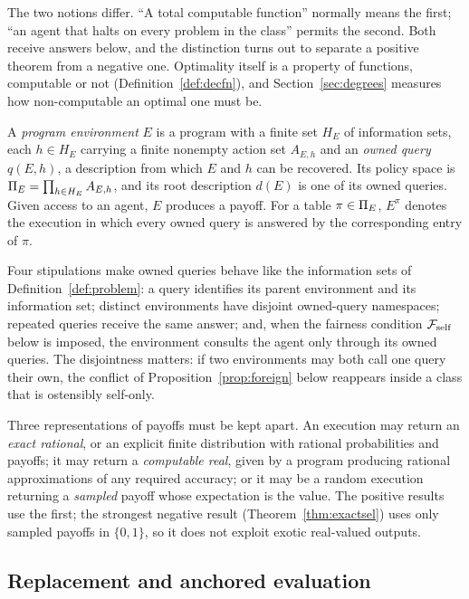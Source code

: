 The two notions differ. \enquote{A total computable function} normally means the first;
\enquote{an agent that halts on every problem in the class} permits the second. Both receive
answers below, and the distinction turns out to separate a positive theorem from a negative one.
Optimality itself is a property of functions, computable or not (Definition~\ref{def:decfn}), and
Section~\ref{sec:degrees} measures how non-computable an optimal one must be.

\begin{definition}\label{def:progenv}
A \emph{program environment} $E$ is a program with a finite set $H_E$ of information sets, each
$h\in H_E$ carrying a finite nonempty action set $A_{E,h}$ and an \emph{owned query} $q(E,h)$, a
description from which $E$ and $h$ can be recovered. Its policy space is
$\Pi_E=\prod_{h\in H_E}A_{E,h}$, and its root description $d(E)$ is one of its owned queries. Given
access to an agent, $E$ produces a payoff. For a table $\pi\in\Pi_E$, $E^\pi$ denotes the execution
in which every owned query is answered by the corresponding entry of $\pi$.
\end{definition}

Four stipulations make owned queries behave like the information sets of
Definition~\ref{def:problem}: a query identifies its parent environment and its information set;
distinct environments have disjoint owned-query namespaces; repeated queries receive the same
answer; and, when the fairness condition $\mathcal{F}_{\mathrm{self}}$ below is imposed, the environment
consults the agent only through its owned queries. The disjointness matters: if two environments
may both call one query their own, the conflict of Proposition~\ref{prop:foreign} below reappears
inside a class that is ostensibly self-only.

Three representations of payoffs must be kept apart. An execution may return an \emph{exact
rational}, or an explicit finite distribution with rational probabilities and payoffs; it may return
a \emph{computable real}, given by a program producing rational approximations of any required
accuracy; or it may be a random execution returning a \emph{sampled} payoff whose expectation is
the value. The positive results use the first; the strongest negative result
(Theorem~\ref{thm:exactsel}) uses only sampled payoffs in $\{0,1\}$, so it does not exploit exotic
real-valued outputs.

\subsection{Replacement and anchored evaluation}

